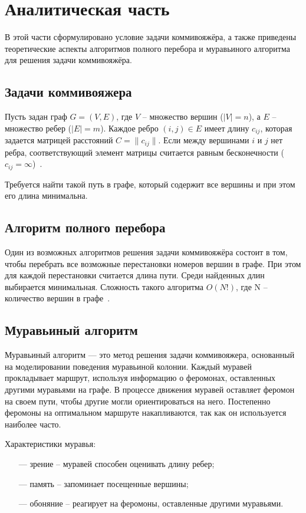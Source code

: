 \documentclass[a4paper, 12pt]{extreport}
\begin{document}
\chapter{Аналитическая часть}

В этой части сформулировано условие задачи коммивояжёра, а также приведены теоретические аспекты алгоритмов полного 
перебора и муравьиного алгоритма для решения задачи коммивояжёра.

\section{Задачи коммивояжера}

Пусть задан граф $G = (V, E)$, где $V$ -- множество вершин ($|V| = n$), а $E$ -- множество ребер ($|E| = m$). Каждое ребро $(i, j) 
\in E$ имеет длину $c_{ij}$, которая задается матрицей расстояний $C = \|c_{ij}\|$. Если между вершинами $i$ и $j$ нет ребра, 
соответствующий элемент матрицы считается равным бесконечности ($c_{ij} = \infty$)~\cite{comi}.

Требуется найти такой путь в графе, который содержит все вершины и при этом его длина минимальна.

\section{Алгоритм полного перебора}

Один из возможных алгоритмов решения задачи коммивояжёра состоит в том, чтобы перебрать все возможные перестановки
номеров вершин в графе. При этом для каждой перестановки считается длина пути. Среди найденных длин выбирается 
минимальная. Сложность такого алгоритма $O(N!)$, где N -- количество вершин в графе~\cite{comi}.

\section{Муравьиный алгоритм}

Муравьиный алгоритм --- это метод решения задачи коммивояжера, основанный на моделировании поведения муравьиной 
колонии. Каждый муравей прокладывает маршрут, используя информацию о феромонах, оставленных другими 
муравьями на графе. В процессе движения муравей оставляет феромон на своем пути, чтобы другие могли ориентироваться на 
него. Постепенно феромоны на оптимальном маршруте накапливаются, так как он используется наиболее часто.~\cite{shtovba}

Характеристики муравья:
\begin{itemize}
    \item[---] зрение -- муравей способен оценивать длину ребер;
    \item[---] память -- запоминает посещенные вершины;
    \item[---] обоняние -- реагирует на феромоны, оставленные другими муравьями.
\end{itemize}
\end{document}
